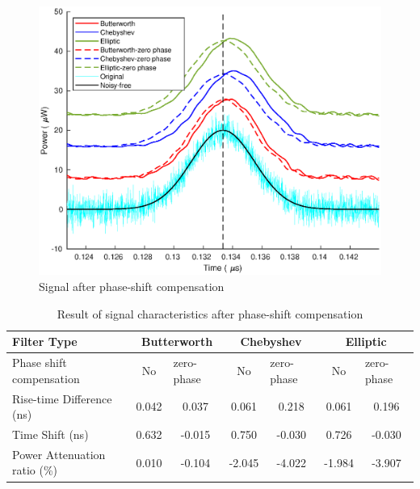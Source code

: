 %
\begin{figure}[t!p]
\centering
\includegraphics[width=1\textwidth]{figures/chapter_AFE/sig_filtfilt.eps}
\caption{Signal after phase-shift compensation}
\label{fig:AFE_filtfilt}
\end{figure}
%
\begin{table}[h]
\centering
\caption{Result of signal characteristics after phase-shift compensation}
\label{table:AFE_res_phaseComp}
\begin{tabular}{|l|c|c|c|c|c|c|}
\hline
Filter Type & \multicolumn{2}{c|}{Butterworth} & \multicolumn{2}{c|}{Chebyshev} & \multicolumn{2}{c|}{Elliptic} \\ \hline
Phase shift compensation & No & \multicolumn{1}{l|}{zero-phase} & No & \multicolumn{1}{l|}{zero-phase} & No & \multicolumn{1}{l|}{zero-phase} \\ \hline
Rise-time Difference (ns) & 0.042 & 0.037 & 0.061 & 0.218 & 0.061 & 0.196 \\ \hline
Time Shift (ns) & 0.632 & -0.015 & 0.750 & -0.030 & 0.726 & -0.030 \\ \hline
Power Attenuation ratio (\%) & 0.010 & -0.104 & -2.045 & -4.022 & -1.984 & -3.907 \\ \hline
\end{tabular}
\end{table}






